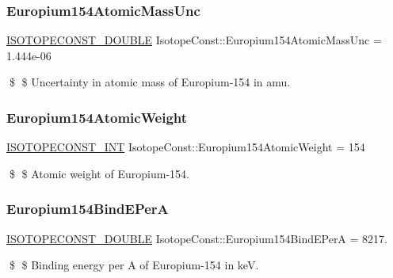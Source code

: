 \subsubsection{\texorpdfstring{Europium154\+Atomic\+Mass\+Unc}{Europium154AtomicMassUnc}}
{\footnotesize\ttfamily \mbox{\hyperlink{group___isotope_const-_macros_ga8f45a7272ce02c0b4c65c44636ed719a}{I\+S\+O\+T\+O\+P\+E\+C\+O\+N\+S\+T\+\_\+\+D\+O\+U\+B\+LE}} Isotope\+Const\+::\+Europium154\+Atomic\+Mass\+Unc = 1.\+444e-\/06}

\$ \$ Uncertainty in atomic mass of Europium-\/154 in amu. \mbox{\label{group___isotope_const-_europium-_eu154_gae8621c70a2d761416f4e9b4a83f0582b}} 
\subsubsection{\texorpdfstring{Europium154\+Atomic\+Weight}{Europium154AtomicWeight}}
{\footnotesize\ttfamily \mbox{\hyperlink{group___isotope_const-_macros_ga5f18360b3e99483a35c32d789e62621c}{I\+S\+O\+T\+O\+P\+E\+C\+O\+N\+S\+T\+\_\+\+I\+NT}} Isotope\+Const\+::\+Europium154\+Atomic\+Weight = 154}

\$ \$ Atomic weight of Europium-\/154. \mbox{\label{group___isotope_const-_europium-_eu154_ga242c1f367ca220a405533297ed984563}} 
\subsubsection{\texorpdfstring{Europium154\+Bind\+E\+PerA}{Europium154BindEPerA}}
{\footnotesize\ttfamily \mbox{\hyperlink{group___isotope_const-_macros_ga8f45a7272ce02c0b4c65c44636ed719a}{I\+S\+O\+T\+O\+P\+E\+C\+O\+N\+S\+T\+\_\+\+D\+O\+U\+B\+LE}} Isotope\+Const\+::\+Europium154\+Bind\+E\+PerA = 8217.}

\$ \$ Binding energy per A of Europium-\/154 in keV. \mbox{\label{group___isotope_const-_europium-_eu154_gaaaf7d572327d365078628864c197d083}} 
